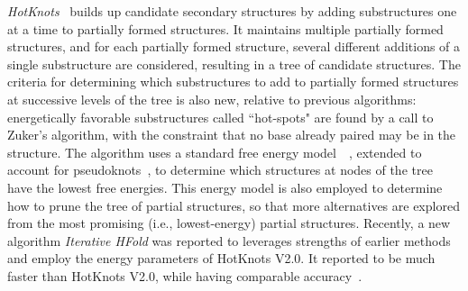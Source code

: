 \documentclass{doublecol-new}
\theoremstyle{TH}{
\newtheorem{lemma}{Lemma}
\newtheorem{theorem}[lemma]{Theorem}
\newtheorem{corrolary}[lemma]{Corrolary}
\newtheorem{conjecture}[lemma]{Conjecture}
\newtheorem{proposition}[lemma]{Proposition}
\newtheorem{claim}[lemma]{Claim}
\newtheorem{stheorem}[lemma]{Wrong Theorem}
\newtheorem{algorithm}{Algorithm}
}
\theoremstyle{THrm}{
\newtheorem{definition}{Definition}
\newtheorem{question}{Question}
\newtheorem{remark}{Remark}
\newtheorem{scheme}{Scheme}
}
\theoremstyle{THhit}{
\newtheorem{case}{Case}[section]
}
\begin{document}

{\em HotKnots}~\cite{ren_2005} builds up candidate secondary
structures by adding substructures one at a time to partially formed
structures. It maintains multiple partially formed structures, and
for each partially formed structure, several different additions of
a single substructure are considered, resulting in a tree of
candidate structures. The criteria for determining which
substructures to add to partially formed structures at successive
levels of the tree is also new, relative to previous algorithms:
energetically favorable substructures called ``hot-spots" are found
by a call to Zuker's algorithm, with the constraint that no base
already paired may be in the structure. The algorithm uses a
standard free energy model~\cite{serra_1995}~\cite{MathewsSZT99},
extended to account for pseudoknots~\cite{dirks_2003},
to determine which structures at nodes of the tree have the lowest free energies. %
This energy model is also employed to determine how to prune the tree of partial structures,
so that more alternatives are explored from the most promising (i.e., lowest-energy) partial structures.
Recently, a new algorithm {\em Iterative HFold} was reported to  leverages strengths of earlier methods and 
employ the energy parameters of HotKnots V2.0. It reported to be  
much faster than HotKnots V2.0, while having comparable accuracy~\cite{Jabbari_2014}. 


\end{document}
